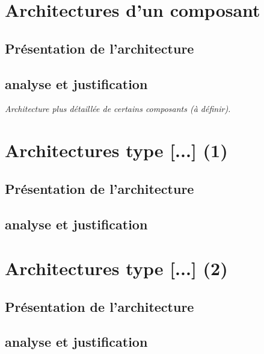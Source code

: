 \section{Architectures d'un composant}
\subsection{Présentation de l'architecture}
\subsection{analyse et justification}

\textit{Architecture plus détaillée de certains composants (à définir).}



\section{Architectures type [...] (1)}
\subsection{Présentation de l'architecture}
\subsection{analyse et justification}



\section{Architectures type [...] (2)}
\subsection{Présentation de l'architecture}
\subsection{analyse et justification}